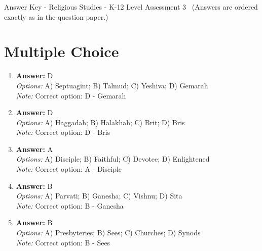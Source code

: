 \documentclass[12pt]{article}
\begin{document}
\begin{center}
Answer Key - Religious Studies - K-12 Level Assessment 3 \
\small (Answers are ordered exactly as in the question paper.)
\end{center}

\section*{Multiple Choice}
\begin{enumerate}[label=\arabic*.]
\item \textbf{Answer:} D
\\ \textit{Options:} A) Septuagint; B) Talmud; C) Yeshiva; D) Gemarah
\\ \textit{Note:} Correct option: D - Gemarah
\item \textbf{Answer:} D
\\ \textit{Options:} A) Haggadah; B) Halakhah; C) Brit; D) Bris
\\ \textit{Note:} Correct option: D - Bris
\item \textbf{Answer:} A
\\ \textit{Options:} A) Disciple; B) Faithful; C) Devotee; D) Enlightened
\\ \textit{Note:} Correct option: A - Disciple
\item \textbf{Answer:} B
\\ \textit{Options:} A) Parvati; B) Ganesha; C) Vishnu; D) Sita
\\ \textit{Note:} Correct option: B - Ganesha
\item \textbf{Answer:} B
\\ \textit{Options:} A) Presbyteries; B) Sees; C) Churches; D) Synods
\\ \textit{Note:} Correct option: B - Sees
\end{enumerate}
\end{document}
